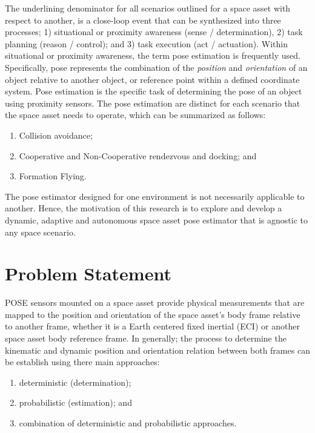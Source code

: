 The underlining denominator for all scenarios outlined for a space asset with respect to another, is a close-loop event that can be synthesized into three processes; 1) situational or proximity awareness (sense / determination), 2) task planning (reason / control); and 3) task execution (act / actuation). Within situational or proximity awareness, the term pose estimation is frequently used. Specifically, pose represents the combination of the \textit{position} and \textit{orientation} of an object relative to another object, or reference point within a defined coordinate system.  Pose estimation is the specific task of determining the pose of an object using proximity sensors. The pose estimation are distinct for each scenario that the space asset needs to operate, which can be summarized as follows:
\begin{enumerate}
    \item Collision avoidance; 
    \item Cooperative and Non-Cooperative rendezvous and docking; and
    \item Formation Flying.
\end{enumerate}

The pose estimator designed for one environment is not necessarily applicable to another. Hence, the motivation of this research is to explore and develop a dynamic, adaptive and autonomous space asset pose estimator that is agnostic to any space scenario.

\section{Problem Statement}\label{CHAP1_2}

POSE sensors mounted on a space asset provide physical measurements that are mapped to the position and orientation of the space asset's body frame relative to another frame, whether it is a Earth centered fixed inertial (ECI) or another space asset body reference frame. In generally; the process to determine the kinematic and dynamic position and orientation relation between both frames can be establish using there main approaches:
\begin{enumerate}
    \item deterministic (determination);
    \item probabilistic (estimation); and   
    \item combination of deterministic and probabilistic approaches. 
\end{enumerate}

